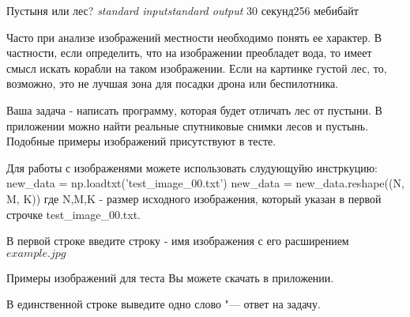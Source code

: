 \begin{problem}{Пустыня или лес?}
{\textsl{standard input}}{\textsl{standard output}}
{30 секунд}{256 мебибайт}{}

Часто при анализе изображений местности необходимо понять ее характер. В частности, если определить, что на изображении преобладет вода, то имеет смысл искать корабли на таком изображении. Если на картинке густой лес, то, возможно, это не лучшая зона для посадки дрона или беспилотника.

Ваша задача - написать программу, которая будет отличать лес от пустыни. В приложении можно найти реальные спутниковые снимки лесов и пустынь. Подобные примеры изображений присутствуют в тесте.   

Для работы с изображенями можете использовать слудующуйю инстркуцию:
new_data = np.loadtxt('test_image_00.txt')
new_data = new_data.reshape((N, M, K))
где N,M,K - размер исходного изображения, который указан в первой строчке test_image_00.txt.

\InputFile

В первой строке введите строку - имя изображения с его расширением $example.jpg$

Примеры изображений для теста Вы можете скачать в приложении.

\OutputFile

В единственной строке выведите одно слово "--- ответ на задачу.

\Examples

\begin{example}
%

%


\end{example}

\Explanations

\end{problem}
